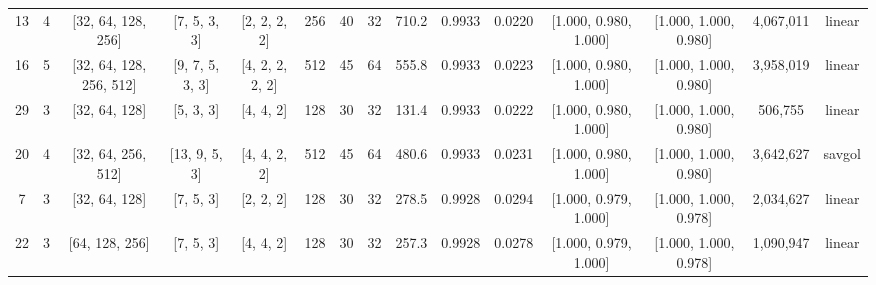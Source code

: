 \begin{table}[htbp]
\begin{tabular}{|c|c|c|c|c|c|c|c|c|c|c|c|c|c|c|}
13 & 4 & [32, 64, 128, 256] & [7, 5, 3, 3] & [2, 2, 2, 2] & 256 & 40 & 32 & 710.2 & 0.9933 & 0.0220 & [1.000, 0.980, 1.000] & [1.000, 1.000, 0.980] & 4,067,011 & linear \\
16 & 5 & [32, 64, 128, 256, 512] & [9, 7, 5, 3, 3] & [4, 2, 2, 2, 2] & 512 & 45 & 64 & 555.8 & 0.9933 & 0.0223 & [1.000, 0.980, 1.000] & [1.000, 1.000, 0.980] & 3,958,019 & linear \\
29 & 3 & [32, 64, 128] & [5, 3, 3] & [4, 4, 2] & 128 & 30 & 32 & 131.4 & 0.9933 & 0.0222 & [1.000, 0.980, 1.000] & [1.000, 1.000, 0.980] & 506,755 & linear \\
20 & 4 & [32, 64, 256, 512] & [13, 9, 5, 3] & [4, 4, 2, 2] & 512 & 45 & 64 & 480.6 & 0.9933 & 0.0231 & [1.000, 0.980, 1.000] & [1.000, 1.000, 0.980] & 3,642,627 & savgol \\
7 & 3 & [32, 64, 128] & [7, 5, 3] & [2, 2, 2] & 128 & 30 & 32 & 278.5 & 0.9928 & 0.0294 & [1.000, 0.979, 1.000] & [1.000, 1.000, 0.978] & 2,034,627 & linear \\
22 & 3 & [64, 128, 256] & [7, 5, 3] & [4, 4, 2] & 128 & 30 & 32 & 257.3 & 0.9928 & 0.0278 & [1.000, 0.979, 1.000] & [1.000, 1.000, 0.978] & 1,090,947 & linear \\
\bottomrule
\end{tabular}
\end{table}

